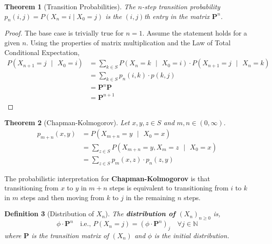 \documentclass{tufte-handout}
\newtheorem{thm}{Theorem}
\newtheorem{defn}[thm]{Definition}
\begin{document}
  \begin{thm}[Transition Probabilities]
    The $n$-step transition probability $p_n(i,j) = P(X_n = i \mid X_0 = j)$ is the $(i,j)$th entry in the matrix $\boldsymbol{P}^n$.
  \end{thm}

  \begin{proof}
  The base case is trivially true for $n = 1$. Assume the statement holds for a given $n$. Using the properties of matrix multiplication and the Law of Total Conditional Expectation,
  \begin{align*}
    P(X_{n+1} = j \text{ $|$ } X_0 = i)
    &= \sum_{k \in S} P(X_{n} = k \text{ $|$ } X_0 = i) \cdot P(X_{n+1} = j \text{ $|$ } X_n = k) \\
    &= \sum_{k \in S} p_n(i,k) \cdot p(k,j) \\ 
    &= \boldsymbol{P}^n\boldsymbol{P} \\
    &= \boldsymbol{P}^{n+1}
  \end{align*}
  \end{proof}

  \begin{thm}[Chapman-Kolmogorov]
    Let $x,y,z \in S$ and $m, n \in (0, \infty)$.
    \begin{align*}
      p_{m+n}(x,y) &= P(X_{m+n} = y \text{ $|$ } X_0 = x) \\
      &= \sum_{z \in S}P(X_{m+n} = y, X_m = z \text{ $|$ } X_0 = x) \\
      &= \sum_{z \in S}p_m(x,z) \cdot p_n(z,y)
    \end{align*}
  \end{thm}

  \begin{marginfigure}
    The probabilistic interpretation for \textbf{Chapman-Kolmogorov} is that transitioning from $x$ to $y$ in $m + n$ steps is equivalent to transitioning from $i$ to $k$ in $m$ steps and then moving from $k$ to $j$ in the remaining $n$ steps.
  \end{marginfigure}

  \begin{defn}[Distribution of $X_n$]
    The \textbf{distribution of $(X_n)_{n \geq 0}$} is,
    \[\phi \cdot \boldsymbol{P}^n \quad \text{i.e., } P(X_n = j) = (\phi \cdot \boldsymbol{P}^n)_{j} \quad \forall j \in \mathbb{N}\]
    \noindent where $\boldsymbol{P}$ is the transition matrix of $(X_n)$ and $\phi$ is the initial distribution.
  \end{defn}
\end{document}
